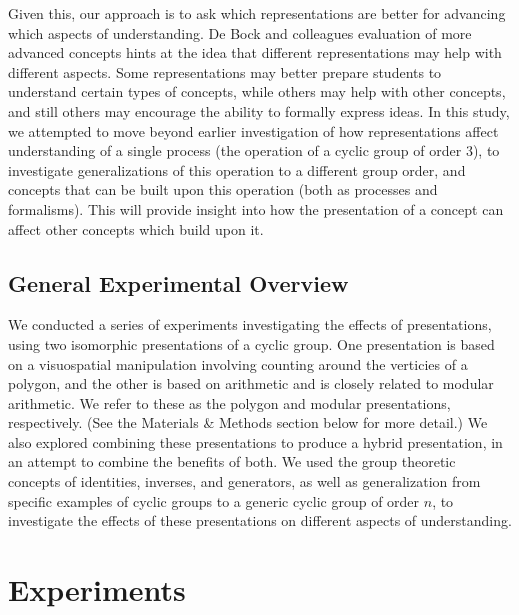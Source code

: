 \documentclass[man,10pt]{apa6}
\begin{document}
Given this, our approach is to ask which representations are better for advancing which aspects of understanding. De Bock and colleagues evaluation of more advanced concepts hints at the idea that different representations may help with different aspects. Some representations may better prepare students to understand certain types of concepts, while others may help with other concepts, and still others may encourage the ability to formally express ideas. In this study, we attempted to move beyond earlier investigation of how representations affect understanding of a single process (the operation of a cyclic group of order 3), to investigate generalizations of this operation to a different group order, and concepts that can be built upon this operation (both as processes and formalisms). This will provide insight into how the presentation of a concept can affect other concepts which build upon it.
\subsection{General Experimental Overview}
We conducted a series of experiments investigating the effects of presentations, using two isomorphic presentations of a cyclic group. One presentation is based on a visuospatial manipulation involving counting around the verticies of a polygon, and the other is based on arithmetic and is closely related to modular arithmetic. We refer to these as the polygon and modular presentations, respectively. (See the Materials \& Methods section below for more detail.) We also explored combining these presentations to produce a hybrid presentation, in an attempt to combine the benefits of both. We used the group theoretic concepts of identities, inverses, and generators, as well as generalization from specific examples of cyclic groups to a generic cyclic group of order $n$, to investigate the effects of these presentations on different aspects of understanding. 
\section{Experiments}
\end{document}
